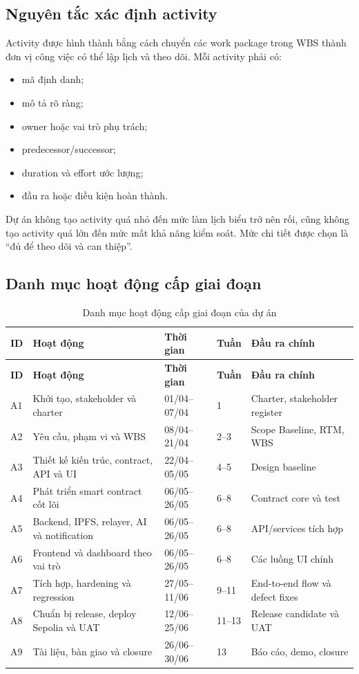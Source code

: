 \subsection{Nguyên tắc xác định activity}

Activity được hình thành bằng cách chuyển các work package trong WBS thành đơn vị công việc có thể lập lịch và theo dõi. Mỗi activity phải có:

\begin{itemize}
  \item mã định danh;
  \item mô tả rõ ràng;
  \item owner hoặc vai trò phụ trách;
  \item predecessor/successor;
  \item duration và effort ước lượng;
  \item đầu ra hoặc điều kiện hoàn thành.
\end{itemize}

Dự án không tạo activity quá nhỏ đến mức làm lịch biểu trở nên rối, cũng không tạo activity quá lớn đến mức mất khả năng kiểm soát. Mức chi tiết được chọn là “đủ để theo dõi và can thiệp”.

\subsection{Danh mục hoạt động cấp giai đoạn}

\begin{longtable}{| p{0.9cm} | p{4.5cm} | p{2.3cm} | p{1.5cm} | p{3.1cm} |}
\caption{Danh mục hoạt động cấp giai đoạn của dự án}\label{tab:schedule-activities}\\
\hline
\textbf{ID} & \textbf{Hoạt động} & \textbf{Thời gian} & \textbf{Tuần} & \textbf{Đầu ra chính} \\
\hline
\endfirsthead
\hline
\textbf{ID} & \textbf{Hoạt động} & \textbf{Thời gian} & \textbf{Tuần} & \textbf{Đầu ra chính} \\
\hline
\endhead
A1 & Khởi tạo, stakeholder và charter & 01/04--07/04 & 1 & Charter, stakeholder register \\ \hline
A2 & Yêu cầu, phạm vi và WBS & 08/04--21/04 & 2--3 & Scope Baseline, RTM, WBS \\ \hline
A3 & Thiết kế kiến trúc, contract, API và UI & 22/04--05/05 & 4--5 & Design baseline \\ \hline
A4 & Phát triển smart contract cốt lõi & 06/05--26/05 & 6--8 & Contract core và test \\ \hline
A5 & Backend, IPFS, relayer, AI và notification & 06/05--26/05 & 6--8 & API/services tích hợp \\ \hline
A6 & Frontend và dashboard theo vai trò & 06/05--26/05 & 6--8 & Các luồng UI chính \\ \hline
A7 & Tích hợp, hardening và regression & 27/05--11/06 & 9--11 & End-to-end flow và defect fixes \\ \hline
A8 & Chuẩn bị release, deploy Sepolia và UAT & 12/06--25/06 & 11--13 & Release candidate và UAT \\ \hline
A9 & Tài liệu, bàn giao và closure & 26/06--30/06 & 13 & Báo cáo, demo, closure \\
\hline
\end{longtable}

